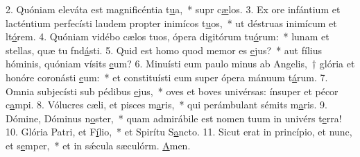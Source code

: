 2. Quóniam eleváta est magnificéntia t\uline{u}a,~* supr c\uline{æ}los.
3. Ex ore infántium et lacténtium perfecísti laudem propter inimícos t\uline{u}os,~* ut déstruas inimícum et lt\uline{ó}rem.
4. Quóniam vidébo cælos tuos, ópera digitórum tu\uline{ó}rum:~* lunam et stellas, quæ tu fnd\uline{á}sti.
5. Quid est homo quod memor es \uline{e}jus?~* aut fílius hóminis, quóniam vísits \uline{e}um?
6. Minuísti eum paulo minus ab Angelis,~† glória et honóre coronásti \uline{e}um:~* et constituísti eum super ópera mánuum t\uline{á}rum.
7. Omnia subjecísti sub pédibus \uline{e}jus,~* oves et boves univérsas: ínsuper et pécor c\uline{a}mpi.
8. Vólucres cæli, et pisces m\uline{a}ris,~* qui perámbulant sémits m\uline{a}ris.
9. Dómine, Dóminus n\uline{o}ster,~* quam admirábile est nomen tuum in univérs t\uline{e}rra!
10. Glória Patri, et F\uline{í}lio,~* et Spirítu S\uline{a}ncto.
11. Sicut erat in princípio, et nunc, et s\uline{e}mper,~* et in sǽcula sæculórm. \uline{A}men.
